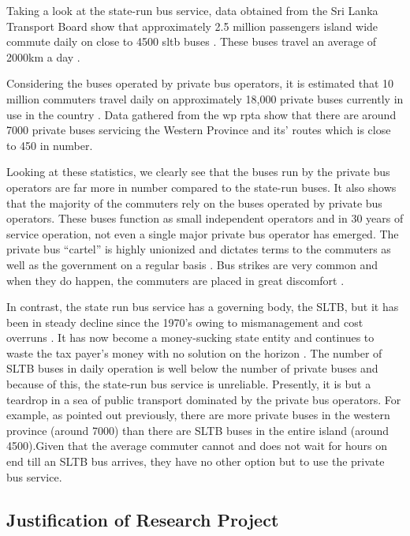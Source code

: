 Taking a look at the state-run bus service, data obtained from the Sri Lanka Transport Board show that approximately 2.5 million passengers island wide commute daily on close to 4500 \acrshort{sltb} buses \cite{SriLankaTransportBoard2010}. These buses travel an average of 2000km a day \cite{SriLankaTransportBoard2012}. 

Considering the buses operated by private bus operators, it is estimated that 10 million commuters travel daily on approximately 18,000 private buses currently in use in the country \cite{Silva2010}. Data gathered from the \acrshort{wp} \acrshort{rpta} show that there are around 7000 private buses servicing the Western Province and its’ routes which is close to 450 in number. 

Looking at these statistics, we clearly see that the buses run by the private bus operators are far more in number compared to the state-run buses. It also shows that the majority of the commuters rely on the buses operated by private bus operators. These buses function as small independent operators and in 30 years of service operation, not even a single major private bus operator has emerged. The private bus “cartel” is highly unionized and dictates terms to the commuters as well as the government on a regular basis \cite{AdaDerana2012}. Bus strikes are very common and when they do happen, the commuters are placed in great discomfort \cite{Samarajiva2012, ColomboPage2012}.

In contrast, the state run bus service has a governing body, the SLTB, but it has been in steady decline since the 1970’s owing to mismanagement and cost overruns \cite{AnswersDotCom2012}. It has now become a money-sucking state entity and continues to waste the tax payer's money with no solution on the horizon \cite{LBO2011, Sirimanne2013}. The number of SLTB buses in daily operation is well below the number of private buses and because of this, the state-run bus service is unreliable. Presently, it is but a teardrop in a sea of public transport dominated by the private bus operators. For example, as pointed out previously, there are more private buses in the western province (around 7000) than there are SLTB buses in the entire island (around 4500).Given that the average commuter cannot and does not wait for hours on end till an SLTB bus arrives, they have no other option but to use the private bus service. \cite{Wijayapala2012, Azwer2012}

\subsection{Justification of Research Project}


